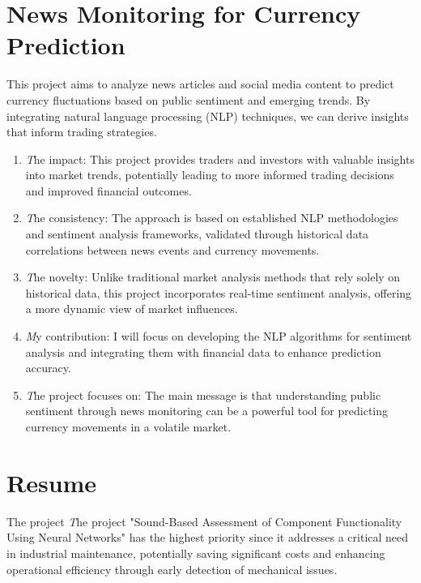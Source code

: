 \documentclass[12pt]{article}
\begin{document}
\section{News Monitoring for Currency Prediction}
This project aims to analyze news articles and social media content to predict currency fluctuations based on public sentiment and emerging trends. By integrating natural language processing (NLP) techniques, we can derive insights that inform trading strategies.
\begin{enumerate}
\item \emph The impact: This project provides traders and investors with valuable insights into market trends, potentially leading to more informed trading decisions and improved financial outcomes.
\item \emph The consistency: The approach is based on established NLP methodologies and sentiment analysis frameworks, validated through historical data correlations between news events and currency movements.
\item \emph The novelty: Unlike traditional market analysis methods that rely solely on historical data, this project incorporates real-time sentiment analysis, offering a more dynamic view of market influences.
\item \emph My contribution: I will focus on developing the NLP algorithms for sentiment analysis and integrating them with financial data to enhance prediction accuracy.
\item \emph The project focuses on: The main message is that understanding public sentiment through news monitoring can be a powerful tool for predicting currency movements in a volatile market.
\end{enumerate}

\section{Resume}
The project \emph The project "Sound-Based Assessment of Component Functionality Using Neural Networks" has the highest priority since it addresses a critical need in industrial maintenance, potentially saving significant costs and enhancing operational efficiency through early detection of mechanical issues.
\end{document}
